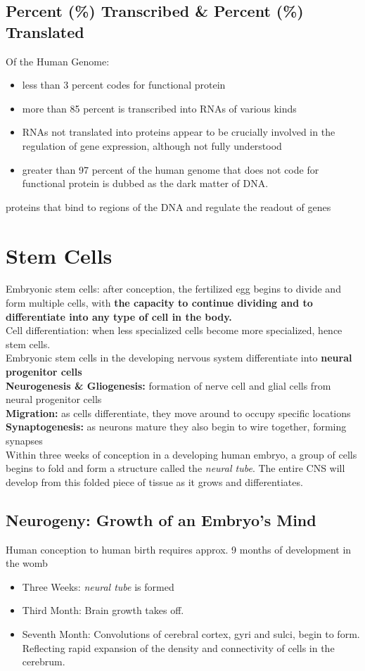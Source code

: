 \documentclass{article}
\begin{document}
\subsection{Percent (\%) Transcribed \& Percent (\%) Translated}
Of the Human Genome: 
\begin{itemize}
    \item less than 3 percent codes for functional protein
    \item more than 85 percent is transcribed into RNAs of various kinds
    \item RNAs not translated into proteins appear to be crucially involved in the regulation of gene expression, although not fully understood
    \item greater than 97 percent of the human genome that does not code for functional protein is dubbed as the dark matter of DNA. 
\end{itemize}

 proteins that bind to regions of the DNA and regulate the readout of genes

\section{Stem Cells}
Embryonic stem cells: after conception, the fertilized egg begins to divide and form multiple cells, with \textbf{the capacity to continue dividing and to differentiate into any type of cell in the body.} \\ 
Cell differentiation: when less specialized cells become more specialized, hence stem cells. \\
Embryonic stem cells in the developing nervous system differentiate into \textbf{neural progenitor cells} \\
\textbf{Neurogenesis \& Gliogenesis:} formation of nerve cell and glial cells from neural progenitor cells \\
\textbf{Migration:} as cells differentiate, they move around to occupy specific locations \\
\textbf{Synaptogenesis:} as neurons mature they also begin to wire together, forming synapses \\
Within three weeks of conception in a developing human embryo, a group of cells begins to fold and form a structure called the \textit{neural tube}. The entire CNS will develop from this folded piece of tissue as it grows and differentiates. \\
\subsection{Neurogeny: Growth of an Embryo's Mind}
Human conception to human birth requires approx. 9 months of development in the womb 
\begin{itemize}
    \item Three Weeks: \textit{neural tube} is formed
    \item Third Month: Brain growth takes off. 
    \item Seventh Month: Convolutions of cerebral cortex, gyri and sulci, begin to form. Reflecting rapid expansion of the density and connectivity of cells in the cerebrum. 
\end{itemize}
\end{document}
